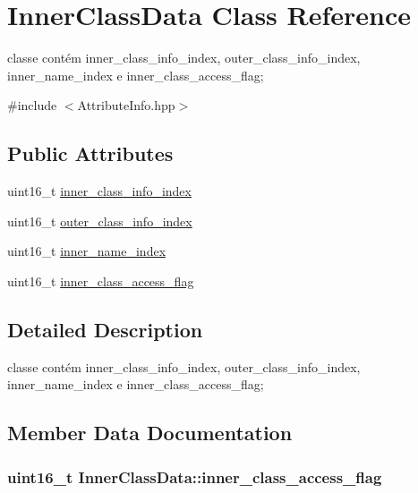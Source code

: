 \hypertarget{class_inner_class_data}{}\section{Inner\+Class\+Data Class Reference}
\label{class_inner_class_data}


classe contém inner\+\_\+class\+\_\+info\+\_\+index, outer\+\_\+class\+\_\+info\+\_\+index, inner\+\_\+name\+\_\+index e inner\+\_\+class\+\_\+access\+\_\+flag;  




{\ttfamily \#include $<$Attribute\+Info.\+hpp$>$}

\subsection*{Public Attributes}
\begin{DoxyCompactItemize}
\item 
uint16\+\_\+t \hyperlink{class_inner_class_data_a58436b7ecd12950e542f64ee18906c59}{inner\+\_\+class\+\_\+info\+\_\+index}
\item 
uint16\+\_\+t \hyperlink{class_inner_class_data_a0370a0b4e7adc2b2524979040dc52f9d}{outer\+\_\+class\+\_\+info\+\_\+index}
\item 
uint16\+\_\+t \hyperlink{class_inner_class_data_af11ac765a0638f41283f42eb51b9064a}{inner\+\_\+name\+\_\+index}
\item 
uint16\+\_\+t \hyperlink{class_inner_class_data_a4c52c10364307d7be48aac8f7a5d88ed}{inner\+\_\+class\+\_\+access\+\_\+flag}
\end{DoxyCompactItemize}


\subsection{Detailed Description}
classe contém inner\+\_\+class\+\_\+info\+\_\+index, outer\+\_\+class\+\_\+info\+\_\+index, inner\+\_\+name\+\_\+index e inner\+\_\+class\+\_\+access\+\_\+flag; 

\subsection{Member Data Documentation}
\subsubsection[{\texorpdfstring{inner\+\_\+class\+\_\+access\+\_\+flag}{inner_class_access_flag}}]{\setlength{\rightskip}{0pt plus 5cm}uint16\+\_\+t Inner\+Class\+Data\+::inner\+\_\+class\+\_\+access\+\_\+flag}\hypertarget{class_inner_class_data_a4c52c10364307d7be48aac8f7a5d88ed}{}\label{class_inner_class_data_a4c52c10364307d7be48aac8f7a5d88ed}
